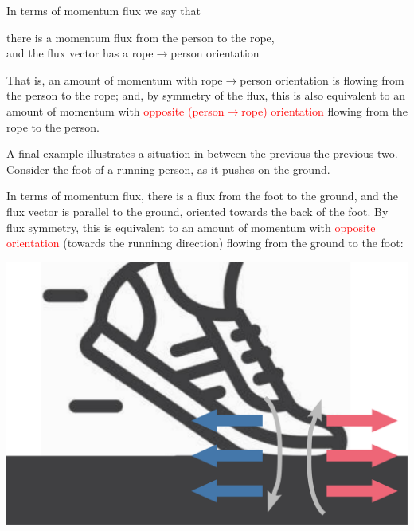 \documentclass[a4paper,12pt,%
onecolumn,oneside,titlepage,%
british%
]{memoir}
\renewcommand*{\|}[1][]{\nonscript\:#1\vert\nonscript\:\mathopen{}}
\begin{document}
{In terms of momentum flux we say that\noprelistbreak
\begin{center}\color{green}
  there is a momentum flux from the person to the rope,\\
  and the flux vector has a \textcolor{bluepurple}{rope$\rightarrow$person orientation}
\end{center}
}
\noindent That is, an amount of momentum with \textcolor{bluepurple}{rope$\rightarrow$person orientation} is flowing from the person to the rope; and, by symmetry of the flux, this is also equivalent to an amount of momentum with \textcolor{red}{opposite (person$\rightarrow$rope) orientation} flowing from the rope to the person.

\smallskip

A final example illustrates a situation in between the previous the previous two. Consider the foot of a running person, as it pushes on the ground. {In terms of momentum flux, there is a flux from the foot to the ground, and the flux vector is parallel to the ground, \textcolor{bluepurple}{oriented towards the back of the foot}. By flux symmetry, this is equivalent to an amount of momentum with \textcolor{red}{opposite orientation} (towards the runninng direction) flowing from the ground to the foot:\noprelistbreak
  \begin{center}
    \includegraphics[width=1\marginparwidth]{foot_shear_ground.pdf}
  \end{center}
}
\end{document}
